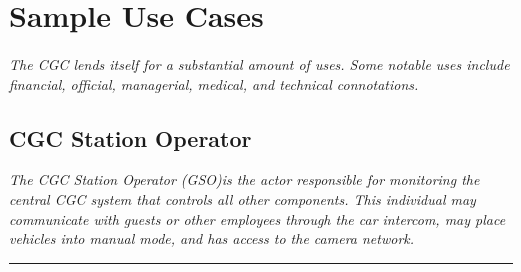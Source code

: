 \documentclass[12pt]{article}
\begin{document}
\section{Sample Use Cases}
\paragraph{} \textit{The CGC lends itself for a substantial amount of uses. Some notable uses include financial,
official, managerial, medical, and technical connotations.}

    \subsection{CGC Station Operator}
    \textit{The CGC Station Operator  (GSO)is the actor responsible for monitoring the central CGC system that
    controls all other components. This individual may communicate with guests or other employees 
    through the car intercom, may place vehicles into manual mode, and has access to the camera network.}
    \par\noindent\rule{\textwidth}{0.4pt}    
\end{document}
